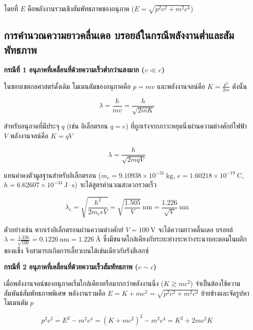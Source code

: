 โดยที่ $E$ คือพลังงานรวมเชิงสัมพัทธภาพของอนุภาค ($E = \sqrt{p^2 c^2 + m^2 c^4}$)

\subsection{การคำนวณความยาวคลื่นเดอ บรอยล์ในกรณีพลังงานต่ำและสัมพัทธภาพ}

\textbf{กรณีที่ 1 อนุภาคที่เคลื่อนที่ด้วยความเร็วต่ำกว่าแสงมาก ($v \ll c$)}

ในขอบเขตกลศาสตร์ดั้งเดิม โมเมนตัมของอนุภาคคือ $p = m v$ และพลังงานจลน์คือ $K = \frac{p^2}{2m}$ ดังนั้น

\begin{equation}
\lambda = \frac{h}{mv} = \frac{h}{\sqrt{2mK}}
\label{eq:de_broglie_classical_K}
\end{equation}

สำหรับอนุภาคที่มีประจุ $q$ (เช่น อิเล็กตรอน $q = e$) ที่ถูกเร่งจากภาวะหยุดนิ่งผ่านความต่างศักย์ไฟฟ้า $V$ พลังงานจลน์คือ $K = q V$

\begin{equation}
\lambda = \frac{h}{\sqrt{2m q V}}
\label{eq:de_broglie_accelerated}
\end{equation}

แทนค่าคงตัวมูลฐานสำหรับอิเล็กตรอน ($m_e = 9.10938 \times 10^{-31}~\text{kg}$, $e = 1.60218 \times 10^{-19}~\text{C}$, $h = 6.62607 \times 10^{-34}~\text{J}\cdot\text{s}$) จะได้สูตรคำนวณสะดวกรวดเร็ว

\begin{equation}
\lambda_e = \sqrt{\frac{h^2}{2 m_e e V}} = \sqrt{\frac{1.505}{V}}~\text{nm} = \frac{1.226}{\sqrt{V}}~\text{nm}
\label{eq:de_broglie_electron_shortcut}
\end{equation}

ตัวอย่างเช่น หากเร่งอิเล็กตรอนผ่านความต่างศักย์ $V = 100~\text{V}$ จะได้ความยาวคลื่นเดอ บรอยล์ $\lambda = \frac{1.226}{\sqrt{100}} = 0.1226~\text{nm} = 1.226~\text{\AA}$ ซึ่งมีขนาดใกล้เคียงกับระยะห่างระหว่างระนาบอะตอมในผลึกของแข็ง จึงสามารถเกิดการเลี้ยวเบนได้เช่นเดียวกับรังสีเอกซ์

\textbf{กรณีที่ 2 อนุภาคที่เคลื่อนที่ด้วยความเร็วสัมพัทธภาพ ($v \sim c$)}

เมื่อพลังงานจลน์ของอนุภาคเริ่มใกล้เคียงหรือมากกว่าพลังงานนิ่ง ($K \gtrsim m c^2$) จำเป็นต้องใช้ความสัมพันธ์สัมพัทธภาพพิเศษ พลังงานรวมคือ $E = K + m c^2 = \sqrt{p^2 c^2 + m^2 c^4}$ ย้ายข้างและจัดรูปหาโมเมนตัม $p$

\begin{equation}
p^2 c^2 = E^2 - m^2 c^4 = (K + m c^2)^2 - m^2 c^4 = K^2 + 2 m c^2 K
\end{equation}

